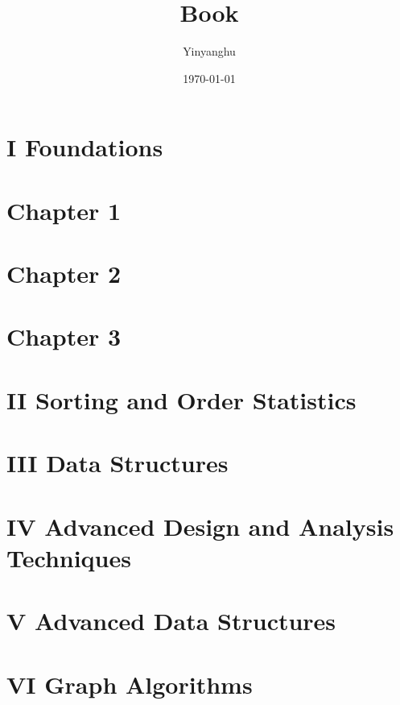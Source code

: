 \documentclass[11pt,a4paper]{book}
\title{Book}
\author{Yinyanghu}
\date{\today}
\begin{document}
\frontmatter
\maketitle

\tableofcontents
\listoffigures
\listoftables

\mainmatter


\section*{I Foundations}
\pagebreak

\section*{Chapter 1}

\pagebreak

\section*{Chapter 2}

\pagebreak


\section*{Chapter 3}

\pagebreak

\section*{II Sorting and Order Statistics}
\pagebreak


\section*{III Data Structures}
\pagebreak


\section*{IV Advanced Design and Analysis Techniques}
\pagebreak

\section*{V Advanced Data Structures}
\pagebreak


\section*{VI Graph Algorithms}
\pagebreak
\end{document}
